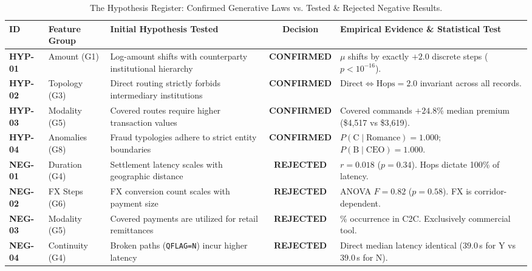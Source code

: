 \documentclass[11pt,a4paper]{article}
\begin{document}
\begin{table}[H]
\centering\small
\caption{The Hypothesis Register: Confirmed Generative Laws vs. Tested \& Rejected Negative Results.}
\label{tab:hypothesis_ledger}
\renewcommand{\arraystretch}{1.25}
\begin{tabularx}{\textwidth}{@{}l >{\raggedright\arraybackslash}p{2.2cm} >{\raggedright\arraybackslash}p{4.6cm} c >{\raggedright\arraybackslash}X@{}}
\toprule
\textbf{ID} & \textbf{Feature Group} & \textbf{Initial Hypothesis Tested} & \textbf{Decision} & \textbf{Empirical Evidence \& Statistical Test} \\ \midrule
\textbf{HYP-01} & Amount (G1) & Log-amount shifts with counterparty institutional hierarchy & \textbf{CONFIRMED} & $\mu$ shifts by exactly $+2.0$ discrete steps ($p < 10^{-16}$). \\
\textbf{HYP-02} & Topology (G3) & Direct routing strictly forbids intermediary institutions & \textbf{CONFIRMED} & $\text{Direct} \iff \text{Hops} = 2.0$ invariant across all records. \\
\textbf{HYP-03} & Modality (G5) & Covered routes require higher transaction values & \textbf{CONFIRMED} & Covered commands $+24.8\%$ median premium (\$4,517 vs \$3,619). \\
\textbf{HYP-04} & Anomalies (G8) & Fraud typologies adhere to strict entity boundaries & \textbf{CONFIRMED} & $P(\text{C} \mid \text{Romance}) = 1.000$; $P(\text{B} \mid \text{CEO}) = 1.000$. \\ \midrule
\textbf{NEG-01} & Duration (G4) & Settlement latency scales with geographic distance & \textbf{REJECTED} & $r=0.018$ ($p=0.34$). Hops dictate 100\% of latency. \\
\textbf{NEG-02} & FX Steps (G6) & FX conversion count scales with payment size & \textbf{REJECTED} & ANOVA $F=0.82$ ($p=0.58$). FX is corridor-dependent. \\
\textbf{NEG-03} & Modality (G5) & Covered payments are utilized for retail remittances & \textbf{REJECTED} & 0.0\% occurrence in C2C. Exclusively commercial tool. \\
\textbf{NEG-04} & Continuity (G4) & Broken paths (\texttt{QFLAG=N}) incur higher latency & \textbf{REJECTED} & Direct median latency identical ($39.0$\,s for Y vs $39.0$\,s for N). \\ \bottomrule
\end{tabularx}
\end{table}
\end{document}
